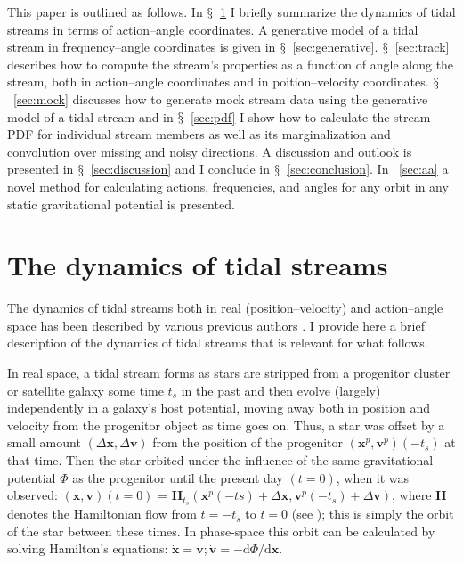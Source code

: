 \documentclass[12pt,preprint]{aastex}
\newcommand{\dd}{\mathrm{d}}
\newcommand{\eg}{e.g.}
\newcommand{\sectionname}{$\mathsection$}
\renewcommand{\vec}[1]{\ensuremath{\mathbf{#1}}}
\newcommand{\vecx}{\ensuremath{\vec{x}}}
\newcommand{\vecv}{\ensuremath{\vec{v}}}
\newcommand{\vech}{\ensuremath{\vec{H}}}
\newcommand{\ts}{\ensuremath{t_s}}
\begin{document}
This paper is outlined as follows. In \sectionname~\ref{sec:dynamics}
I briefly summarize the dynamics of tidal streams in terms of
action--angle coordinates. A generative model of a tidal stream in
frequency--angle coordinates is given in
\sectionname~\ref{sec:generative}. \sectionname~\ref{sec:track}
describes how to compute the stream's properties as a function of
angle along the stream, both in action--angle coordinates and in
poition--velocity coordinates. \sectionname~\ref{sec:mock} discusses
how to generate mock stream data using the generative model of a tidal
stream and in \sectionname~\ref{sec:pdf} I show how to calculate the
stream PDF for individual stream members as well as its
marginalization and convolution over missing and noisy directions. A
discussion and outlook is presented in
\sectionname~\ref{sec:discussion} and I conclude in
\sectionname~\ref{sec:conclusion}. In \appendixname~\ref{sec:aa} a
novel method for calculating actions, frequencies, and angles for any
orbit in any static gravitational potential is presented.


\section{The dynamics of tidal streams}\label{sec:dynamics}

The dynamics of tidal streams both in real (position--velocity) and
action--angle space has been described by various previous authors
\citep[\eg,][]{Helmi99a,Tremaine99a,Johnston99a,Sanders13b}. I provide
here a brief description of the dynamics of tidal streams that is
relevant for what follows.

In real space, a tidal stream forms as stars are stripped from a
progenitor cluster or satellite galaxy some time $\ts$ in the
past and then evolve (largely) independently in a galaxy's host
potential, moving away both in position and velocity from the
progenitor object as time goes on. Thus, a star was offset by a small
amount $(\Delta \vecx,\Delta \vecv)$ from the position of the
progenitor $(\vecx^p,\vecv^p)(-\ts)$ at that time. Then the star
orbited under the influence of the same gravitational potential $\Phi$
as the progenitor until the present day $(t=0)$, when it was observed:
$(\vecx,\vecv)(t=0)$ = $\vech_{\ts}(\vecx^p(-ts)+\Delta
\vecx,\vecv^p(-\ts)+\Delta \vecv)$, where $\vech$ denotes the
Hamiltonian flow from $t=-\ts$ to $t=0$ (see
\citealt{binneytremaine}); this is simply the orbit of the star
between these times. In phase-space this orbit can be calculated by
solving Hamilton's equations: $\dot{\vecx} = \vecv; \dot{\vecv} = -
\dd \Phi / \dd \vecx$.
\end{document}
